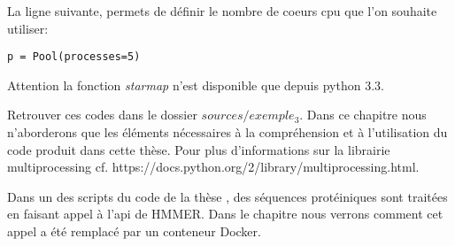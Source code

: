 La ligne suivante, permets de définir le nombre de coeurs \gls{cpu} que l'on souhaite utiliser: 

\begin{lstlisting}[frame=single]
p = Pool(processes=5)
\end{lstlisting} 

Attention la fonction \emph{starmap} n'est disponible que depuis python 3.3.

Retrouver ces codes dans le dossier \emph{$sources/exemple_3$}. Dans ce chapitre nous n'aborderons que les éléments nécessaires à la compréhension et à l'utilisation du code produit dans cette thèse. Pour plus d'informations sur la librairie multiprocessing cf. https://docs.python.org/2/library/multiprocessing.html.

Dans un des scripts du code de la thèse \thLeite , des séquences protéiniques sont traitées en faisant appel à l'\gls{api} de HMMER. Dans le chapitre  nous verrons comment cet appel a été remplacé par un conteneur Docker.







































